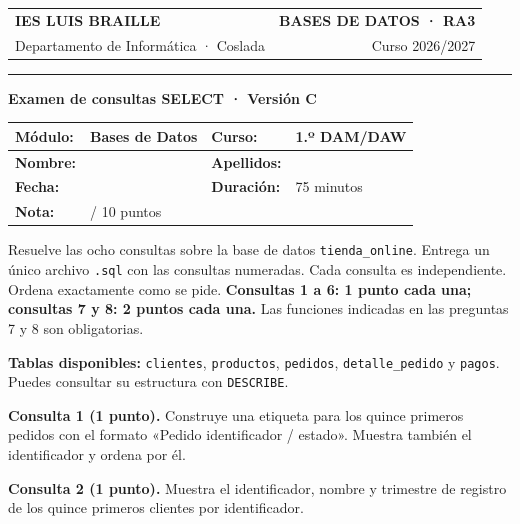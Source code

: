 \documentclass[12pt,a4paper]{article}
\begin{document}
\begin{tabularx}{\textwidth}{@{}Xr@{}}
{\color{primary}\Large\bfseries IES LUIS BRAILLE} & {\color{secondary}\bfseries BASES DE DATOS · RA3} \\
Departamento de Informática · Coslada & Curso 2026/2027 \\
\end{tabularx}
{\color{primary}\rule{\textwidth}{1.2pt}}
\begin{center}{\Large\bfseries Examen de consultas SELECT · Versión C}\end{center}
\vspace{0.2cm}
\begin{tabularx}{\textwidth}{|p{2.4cm}|X|p{2.2cm}|X|}
\hline
\textbf{Módulo:} & Bases de Datos & \textbf{Curso:} & 1.º DAM/DAW \\ \hline
\textbf{Nombre:} & & \textbf{Apellidos:} & \\ \hline
\textbf{Fecha:} & & \textbf{Duración:} & 75 minutos \\ \hline
\textbf{Nota:} & \multicolumn{3}{l|}{\hspace{2cm}/ 10 puntos} \\ \hline
\end{tabularx}
\vspace{0.35cm}
\begin{tcolorbox}[title=Instrucciones]
Resuelve las ocho consultas sobre la base de datos \texttt{tienda\_online}. Entrega un único archivo \texttt{.sql} con las consultas numeradas. Cada consulta es independiente. Ordena exactamente como se pide. \textbf{Consultas 1 a 6: 1 punto cada una; consultas 7 y 8: 2 puntos cada una.} Las funciones indicadas en las preguntas 7 y 8 son obligatorias.
\end{tcolorbox}
{\small\textbf{Tablas disponibles:} \texttt{clientes}, \texttt{productos}, \texttt{pedidos}, \texttt{detalle\_pedido} y \texttt{pagos}. Puedes consultar su estructura con \texttt{DESCRIBE}.}
\par\vspace{0.25cm}
\textbf{Consulta 1 (1 punto).} Construye una etiqueta para los quince primeros pedidos con el formato «Pedido identificador / estado». Muestra también el identificador y ordena por él.\par\vspace{0.65em}
\textbf{Consulta 2 (1 punto).} Muestra el identificador, nombre y trimestre de registro de los quince primeros clientes por identificador.\par\vspace{0.65em}
\end{document}
